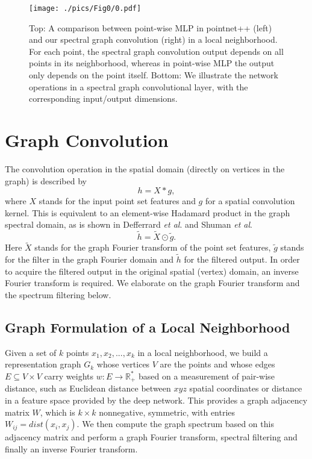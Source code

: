 \documentclass[runningheads]{llncs}
\newcommand{\etal}{\textit{et al}. }
\begin{document}
\begin{figure}[t]
	\centering
	\texttt{[image: ./pics/Fig0/0.pdf]}
	\caption{{\sc Top:} A comparison between point-wise MLP in pointnet++ (left) and our spectral graph convolution (right) in a local neighborhood. For each point, the spectral graph convolution output depends on all points in its neighborhood, whereas in point-wise MLP the output only depends on the point itself. {\sc Bottom:} We illustrate the network operations in a spectral graph convolutional layer, with the corresponding input/output dimensions.}
	\label{fig:fig0}
\end{figure}


\section{Graph Convolution}\label{sec:gCNN}
The convolution operation in the spatial domain (directly on vertices in the graph) is described by
\begin{equation}
h = X * g,
\end{equation}
where $X$ stands for the input point set features and $g$ for a spatial convolution kernel. This is equivalent to an element-wise Hadamard product in the graph spectral domain, as is shown in Defferrard \etal \cite{defferrard2016convolutional} and Shuman \etal \cite{shuman2013emerging}
\begin{equation}
\tilde h = \tilde X \odot \tilde g .
\end{equation}
Here $\tilde{X}$ stands for the graph Fourier transform of the point set features, $\tilde{g}$ stands for the filter in the graph Fourier domain and $\tilde{h}$ for the filtered output. In order to acquire the filtered output in the original spatial (vertex) domain, an inverse Fourier transform is required. We elaborate on the graph Fourier transform and the spectrum filtering below.

\subsection{Graph Formulation of a Local Neighborhood}
Given a set of $k$ points ${x_1, x_2, ..., x_k}$ in a local neighborhood, we build a representation graph $G_{k}$ whose vertices $V$ are the points and whose edges $E \subseteq V \times V$ carry weights $w : E \rightarrow \mathbb{R}_+^*$ based on a measurement of pair-wise distance, such as Euclidean distance between $xyz$ spatial coordinates or distance in a feature space provided by the deep network. This provides a graph adjacency matrix $W$, which is $k \times k$ nonnegative, symmetric, with entries $W_{ij} = dist(x_i,x_j)$. We then compute the graph spectrum based on this adjacency matrix and perform a graph Fourier transform, spectral filtering and finally an inverse Fourier transform.
\end{document}
